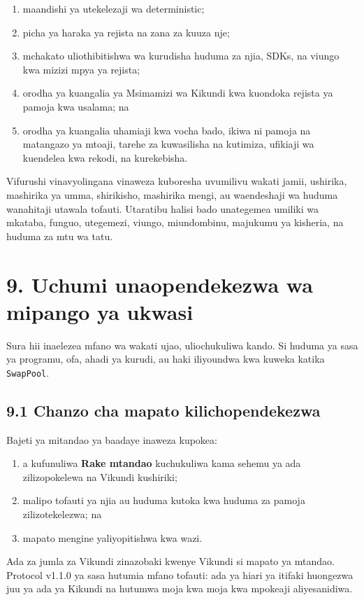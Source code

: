 \documentclass[11pt]{article}
\begin{document}
\begin{enumerate}[leftmargin=*]
\item maandishi ya utekelezaji wa deterministic;
\item picha ya haraka ya rejista na zana za kuuza nje;
\item mchakato uliothibitishwa wa kurudisha huduma za njia, SDKs, na viungo kwa mizizi mpya ya rejista;
\item orodha ya kuangalia ya Msimamizi wa Kikundi kwa kuondoka rejista ya pamoja kwa usalama; na
\item orodha ya kuangalia uhamiaji kwa vocha bado, ikiwa ni pamoja na matangazo ya mtoaji, tarehe za kuwasilisha na kutimiza, ufikiaji wa kuendelea kwa rekodi, na kurekebisha.
\end{enumerate}
Vifurushi vinavyolingana vinaweza kuboresha uvumilivu wakati jamii, ushirika, mashirika ya umma, shirikisho, mashirika mengi, au waendeshaji wa huduma wanahitaji utawala tofauti. Utaratibu halisi bado unategemea umiliki wa mkataba, funguo, utegemezi, viungo, miundombinu, majukumu ya kisheria, na huduma za mtu wa tatu.


\section*{9. Uchumi unaopendekezwa wa mipango ya ukwasi}

Sura hii inaelezea mfano wa wakati ujao, uliochukuliwa kando. Si huduma ya sasa ya programu, ofa, ahadi ya kurudi, au haki iliyoundwa kwa kuweka katika \texttt{SwapPool}.

\subsection*{9.1 Chanzo cha mapato kilichopendekezwa}

Bajeti ya mitandao ya baadaye inaweza kupokea:

\begin{enumerate}[leftmargin=*]
\item a kufunuliwa \textbf{Rake mtandao} kuchukuliwa kama sehemu ya ada zilizopokelewa na Vikundi kushiriki;
\item malipo tofauti ya njia au huduma kutoka kwa huduma za pamoja zilizotekelezwa; na
\item mapato mengine yaliyopitishwa kwa wazi.
\end{enumerate}
Ada za jumla za Vikundi zinazobaki kwenye Vikundi si mapato ya mtandao. Protocol v1.1.0 ya sasa hutumia mfano tofauti: ada ya hiari ya itifaki huongezwa juu ya ada ya Kikundi na hutumwa moja kwa moja kwa mpokeaji aliyesanidiwa.
\end{document}
